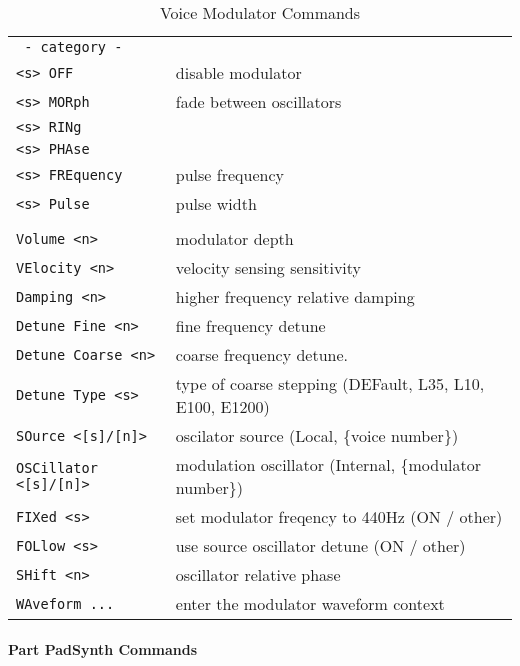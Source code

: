    \begin{table}[h]
      \caption{Voice Modulator Commands}
      \label{table:yoshimi_part_addsynth_voice_modulator_commands}
      \begin{tabular}{l l}

\texttt{ - category - } &
  \\
\texttt{<s> OFF} &
   disable modulator\\
\texttt{<s> MORph} &
   fade between oscillators\\
\texttt{<s> RINg} &
  \\
\texttt{<s> PHAse} &
  \\
\texttt{<s> FREquency} &
   pulse frequency\\
\texttt{<s> Pulse} &
   pulse width\\
\texttt{} &
   \\ %
\texttt{Volume <n>} &
   modulator depth  \\
\texttt{VElocity <n>} &
   velocity sensing sensitivity \\
\texttt{Damping <n>} &
   higher frequency relative damping \\
\texttt{Detune Fine <n>} &
   fine frequency detune \\
\texttt{Detune Coarse <n>} &
   coarse frequency detune. \\
\texttt{Detune Type <s>} &
   type of coarse stepping (DEFault, L35, L10, E100, E1200) \\
\texttt{SOurce <[s]/[n]>} &
    oscilator source (Local, \{voice number\}) \\
\texttt{OSCillator <[s]/[n]>} &
   modulation oscillator (Internal, \{modulator number\}) \\
\texttt{FIXed <s>} &
   set modulator freqency to 440Hz (ON / other) \\
\texttt{FOLlow <s>} &
   use source oscillator detune (ON / other) \\
\texttt{SHift <n>} &
   oscillator relative phase \\
\texttt{WAveform ...} &
   enter the modulator waveform context \\
      \end{tabular}
   \end{table}

\paragraph{Part PadSynth Commands}
\label{paragraph:command_line_part_padsynth_commands}

